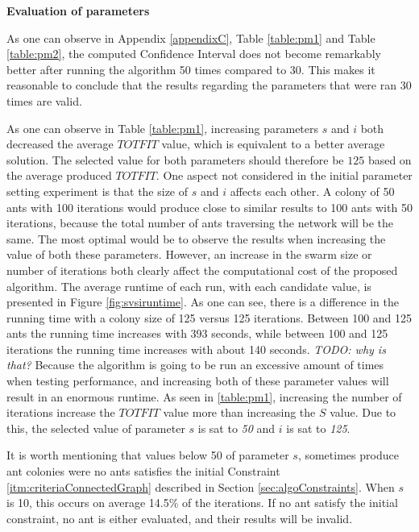 \textbf{Evaluation of parameters}
\newline

As one can observe in Appendix \ref{appendixC}, Table \vref{table:pm1} and Table \vref{table:pm2}, the computed Confidence Interval does not become remarkably better after running the algorithm 50 times compared to 30. This makes it reasonable to conclude that the results regarding the parameters that were ran 30 times are valid.
\newline

As one can observe in Table \vref{table:pm1}, increasing parameters $s$ and $i$ both decreased the average $TOTFIT$ value, which is equivalent to a better average solution. The selected value for both parameters should therefore be $125$ based on the average produced $TOTFIT$. One aspect not considered in the initial parameter setting experiment is that the size of $s$ and $i$ affects each other. A colony of 50 ants with 100 iterations would produce close to similar results to 100 ants with 50 iterations, because the total number of ants traversing the network will be the same. The most optimal would be to observe the results when increasing the value of both these parameters. However, an increase in the swarm size or number of iterations both clearly affect the computational cost of the proposed algorithm. The average runtime of each run, with each candidate value, is presented in Figure \vref{fig:svsiruntime}. As one can see, there is a difference in the running time with a colony size of 125 versus 125 iterations. Between 100 and 125 ants the running time increases with 393 seconds, while between 100 and 125 iterations the running time increases with about 140 seconds. \emph{\color{blue}TODO: why is that?} Because the algorithm is going to be run an excessive amount of times when testing performance, and increasing both of these parameter values will result in an enormous runtime. As seen in \ref{table:pm1}, increasing the number of iterations increase the $TOTFIT$ value more than increasing the $S$ value. Due to this, the selected value of parameter $s$ is sat to \textit{50} and $i$ is sat to \textit{125}.

It is worth mentioning that values below 50 of parameter $s$, sometimes produce ant colonies were no ants satisfies the initial Constraint \ref{itm:criteriaConnectedGraph} described in Section \vref{sec:algoConstraints}. When $s$ is 10, this occurs on average 14.5\% of the iterations. If no ant satisfy the initial constraint, no ant is either evaluated, and their results will be invalid. 

